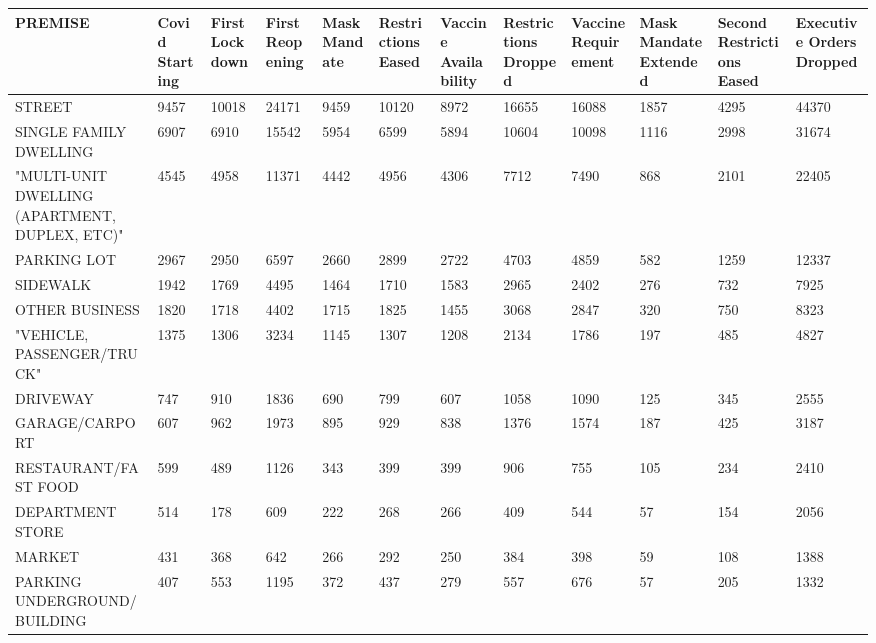\documentclass{article}
\begin{document}
\pagestyle{empty}

\begin{landscape}
\begin{table}[!ht]
    \centering
    \small
    \begin{tabular}{|p{2cm}|*{11}{p{1.7cm}|}}
    \hline
        \rowcolor{lightorange}
        PREMISE & Covid Starting & First Lockdown & First Reopening & Mask Mandate & Restrictions Eased & Vaccine Availability & Restrictions Dropped & Vaccine Requirement & Mask Mandate Extended & Second Restrictions Eased & Executive Orders Dropped \\ \hline
        STREET & 9457 & 10018 & 24171 & 9459 & 10120 & 8972 & 16655 & 16088 & 1857 & 4295 & 44370 \\ \hline
        SINGLE FAMILY DWELLING & 6907 & 6910 & 15542 & 5954 & 6599 & 5894 & 10604 & 10098 & 1116 & 2998 & 31674 \\ \hline
        "MULTI-UNIT DWELLING (APARTMENT, DUPLEX, ETC)" & 4545 & 4958 & 11371 & 4442 & 4956 & 4306 & 7712 & 7490 & 868 & 2101 & 22405 \\ \hline
        PARKING LOT & 2967 & 2950 & 6597 & 2660 & 2899 & 2722 & 4703 & 4859 & 582 & 1259 & 12337 \\ \hline
        SIDEWALK & 1942 & 1769 & 4495 & 1464 & 1710 & 1583 & 2965 & 2402 & 276 & 732 & 7925 \\ \hline
        OTHER BUSINESS & 1820 & 1718 & 4402 & 1715 & 1825 & 1455 & 3068 & 2847 & 320 & 750 & 8323 \\ \hline
        "VEHICLE, PASSENGER/TRUCK" & 1375 & 1306 & 3234 & 1145 & 1307 & 1208 & 2134 & 1786 & 197 & 485 & 4827 \\ \hline
        DRIVEWAY & 747 & 910 & 1836 & 690 & 799 & 607 & 1058 & 1090 & 125 & 345 & 2555 \\ \hline
        GARAGE/CARPORT & 607 & 962 & 1973 & 895 & 929 & 838 & 1376 & 1574 & 187 & 425 & 3187 \\ \hline
        RESTAURANT/FAST FOOD & 599 & 489 & 1126 & 343 & 399 & 399 & 906 & 755 & 105 & 234 & 2410 \\ \hline
        DEPARTMENT STORE & 514 & 178 & 609 & 222 & 268 & 266 & 409 & 544 & 57 & 154 & 2056 \\ \hline
        MARKET & 431 & 368 & 642 & 266 & 292 & 250 & 384 & 398 & 59 & 108 & 1388 \\ \hline
        PARKING UNDERGROUND/BUILDING & 407 & 553 & 1195 & 372 & 437 & 279 & 557 & 676 & 57 & 205 & 1332 \\ \hline

\end{tabular}
\end{table}
\end{landscape}
\end{document}
